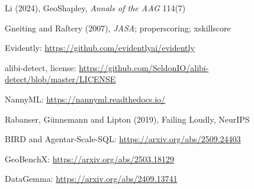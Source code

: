 {\begin{enumerate}[label={[\arabic*]},leftmargin=2.2em,itemsep=1pt]
\item Li (2024), GeoShapley, \emph{Annals of the AAG} 114(7)
\item Gneiting and Raftery (2007), \emph{JASA}; properscoring; xskillscore
\item Evidently: \url{https://github.com/evidentlyai/evidently}
\item alibi-detect, license: \url{https://github.com/SeldonIO/alibi-detect/blob/master/LICENSE}
\item NannyML: \url{https://nannyml.readthedocs.io/}
\item Rabanser, Günnemann and Lipton (2019), Failing Loudly, NeurIPS
\item BIRD and Agentar-Scale-SQL: \url{https://arxiv.org/abs/2509.24403}
\item GeoBenchX: \url{https://arxiv.org/abs/2503.18129}
\item DataGemma: \url{https://arxiv.org/abs/2409.13741}
\end{enumerate}}
